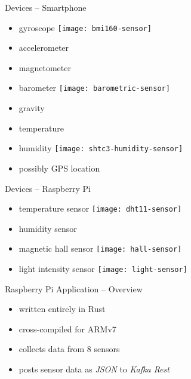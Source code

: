 \documentclass[aspectratio=1610]{beamer}
\begin{document}
  \begin{frame}{Devices -- Smartphone}
    \begin{itemize}
      \item gyroscope
            \hspace*{2em}
            \texttt{[image: bmi160-sensor]}
      \item accelerometer
      \item magnetometer
      \item barometer
            \hspace*{2em}
            \texttt{[image: barometric-sensor]}
      \item gravity
      \item temperature
      \item humidity
            \hspace*{2em}
            \texttt{[image: shtc3-humidity-sensor]}
      \item possibly GPS location
    \end{itemize}
  \end{frame}

  \begin{frame}{Devices -- Raspberry Pi}
    \begin{itemize}
      \item temperature sensor
            \hspace*{2em}
            \texttt{[image: dht11-sensor]}
      \item humidity sensor
      \item magnetic hall sensor
            \hspace*{2em}
            \texttt{[image: hall-sensor]}
      \item light intensity sensor
            \hspace*{2em}
            \texttt{[image: light-sensor]}
    \end{itemize}
  \end{frame}

  \begin{frame}{Raspberry Pi Application -- Overview}
    \begin{itemize}
      \item written entirely in Rust
      \item cross-compiled for ARMv7
      \item collects data from 8 sensors
      \item posts sensor data as \textit{JSON} to \textit{Kafka Rest}
    \end{itemize}
  \end{frame}
\end{document}
